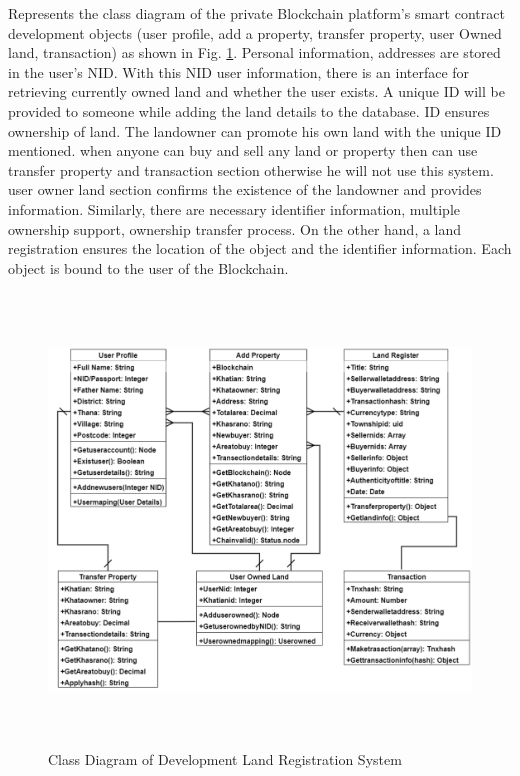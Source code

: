 \documentclass[12pt]{ucthesis}
\begin{document}
    Represents the class diagram of the private Blockchain platform's smart contract development objects (user profile, add a property, transfer property,  user Owned land, transaction) as shown in Fig. \ref{fig5}. Personal information, addresses are stored in the user's NID. With this NID user information, there is an interface for retrieving currently owned land and whether the user exists. A unique ID will be provided to someone while adding the land details to the database. ID ensures ownership of land. The landowner can promote his own land with the unique ID mentioned. when anyone can buy and sell any land or property then can use transfer property and transaction section otherwise he will not use this system.
user owner land section confirms the existence of the landowner and provides information. Similarly, there are necessary identifier information, multiple ownership support, ownership transfer process. On the other hand, a land registration ensures the location of the object and the identifier information. Each object is bound to the user of the Blockchain.
\begin{figure}[!t]
\includegraphics[width=15cm,height=12cm]{img/fig05380.pdf}
\caption{Class Diagram of Development Land Registration System} 
\label{fig5}
\end{figure}
\end{document}
